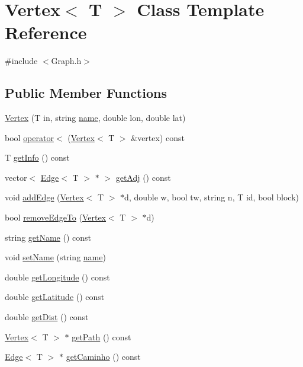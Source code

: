 \hypertarget{class_vertex}{}\section{Vertex$<$ T $>$ Class Template Reference}
\label{class_vertex}


{\ttfamily \#include $<$Graph.\+h$>$}

\subsection*{Public Member Functions}
\begin{DoxyCompactItemize}
\item 
\mbox{\hyperlink{class_vertex_a379ed46a1fc16ae01d69cbd071d5d708}{Vertex}} (T in, string \mbox{\hyperlink{class_vertex_a1990577b54c37df981c81eac40c4af71}{name}}, double lon, double lat)
\item 
bool \mbox{\hyperlink{class_vertex_a5a6670b842354232bac4dad2f551d66e}{operator$<$}} (\mbox{\hyperlink{class_vertex}{Vertex}}$<$ T $>$ \&vertex) const
\item 
T \mbox{\hyperlink{class_vertex_a48eae2f7af2362634adab02b7b2dbec6}{get\+Info}} () const
\item 
vector$<$ \mbox{\hyperlink{class_edge}{Edge}}$<$ T $>$ $\ast$ $>$ \mbox{\hyperlink{class_vertex_a112b3cdac4e2791bd59c21f9e7142d02}{get\+Adj}} () const
\item 
void \mbox{\hyperlink{class_vertex_a7961dc8c855dca6e90fd759f54d1ff18}{add\+Edge}} (\mbox{\hyperlink{class_vertex}{Vertex}}$<$ T $>$ $\ast$d, double w, bool tw, string n, T id, bool block)
\item 
bool \mbox{\hyperlink{class_vertex_ab2b5b43fb1709a901b78718436763a84}{remove\+Edge\+To}} (\mbox{\hyperlink{class_vertex}{Vertex}}$<$ T $>$ $\ast$d)
\item 
string \mbox{\hyperlink{class_vertex_a0c8391ea72196e5a0d05838a22f95e0d}{get\+Name}} () const
\item 
void \mbox{\hyperlink{class_vertex_aee1d15f2efc9c7baecff72265beb1acf}{set\+Name}} (string \mbox{\hyperlink{class_vertex_a1990577b54c37df981c81eac40c4af71}{name}})
\item 
double \mbox{\hyperlink{class_vertex_ae026f50ccedda655c5d5d8a1aba0b018}{get\+Longitude}} () const
\item 
double \mbox{\hyperlink{class_vertex_abcb16841573094ec5328de67c9f7a174}{get\+Latitude}} () const
\item 
double \mbox{\hyperlink{class_vertex_a01e90e3cdb2ee11dd3b1d593c8207382}{get\+Dist}} () const
\item 
\mbox{\hyperlink{class_vertex}{Vertex}}$<$ T $>$ $\ast$ \mbox{\hyperlink{class_vertex_aab5816625f7aa9ee8f3c1b1401673a61}{get\+Path}} () const
\item 
\mbox{\hyperlink{class_edge}{Edge}}$<$ T $>$ $\ast$ \mbox{\hyperlink{class_vertex_a1c21cf30bba0f8953759713b39bb470c}{get\+Caminho}} () const
\end{DoxyCompactItemize}
